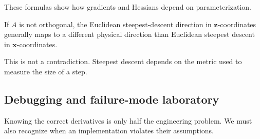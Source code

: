These formulas show how gradients and Hessians depend on parameterization.

If \(A\) is not orthogonal, the Euclidean steepest-descent direction in \(\mathbf z\)-coordinates generally maps to a different physical direction than Euclidean steepest descent in \(\mathbf x\)-coordinates.

This is not a contradiction. Steepest descent depends on the metric used to measure the size of a step.

\subsection{Debugging and failure-mode laboratory}\label{02-foundations-ii-ch021-debugging-and-failure-mode-laboratory}

\hypertarget{02-foundations-ii-ch021-debugging-and-failure-mode-laboratory}{}

Knowing the correct derivatives is only half the engineering problem. We must also recognize when an implementation violates their assumptions.

